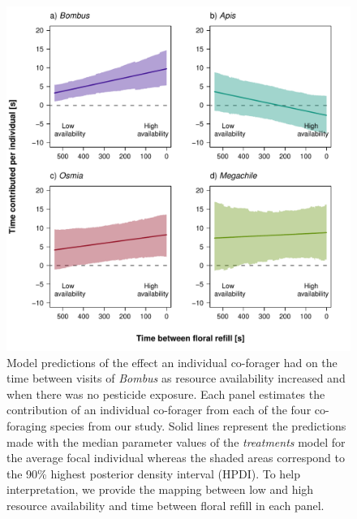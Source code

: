 \begin{refsection}
\begin{figure}[H]
    \centerline{\includegraphics[height=0.7\textheight]{figures/chapter2_fig3.pdf}}
    \caption[Model predictions of the effect an individual co-forager had on the time between visits of \textit{Bombus} as resource availability increased]{Model predictions of the effect an individual co-forager had on the time between visits of \textit{Bombus} as resource availability increased and when there was no pesticide exposure. Each panel estimates the contribution of an individual co-forager from each of the four co-foraging species from our study. Solid lines represent the predictions made with the median parameter values of the \textit{treatments} model for the average focal individual whereas the shaded areas correspond to the 90\% highest posterior density interval (HPDI). To help interpretation, we provide the mapping between low and high resource availability and time between floral refill in each panel.  }
    \label{fig:fig3}
\end{figure}{}






\end{refsection}
